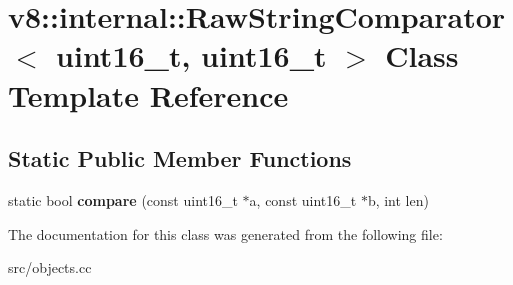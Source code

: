 \hypertarget{classv8_1_1internal_1_1_raw_string_comparator_3_01uint16__t_00_01uint16__t_01_4}{}\section{v8\+:\+:internal\+:\+:Raw\+String\+Comparator$<$ uint16\+\_\+t, uint16\+\_\+t $>$ Class Template Reference}
\label{classv8_1_1internal_1_1_raw_string_comparator_3_01uint16__t_00_01uint16__t_01_4}
\subsection*{Static Public Member Functions}
\begin{DoxyCompactItemize}
\item 
\hypertarget{classv8_1_1internal_1_1_raw_string_comparator_3_01uint16__t_00_01uint16__t_01_4_ab0afdcfb4e2f09e9c15e2aa8e5d4e8b5}{}static bool {\bfseries compare} (const uint16\+\_\+t $\ast$a, const uint16\+\_\+t $\ast$b, int len)\label{classv8_1_1internal_1_1_raw_string_comparator_3_01uint16__t_00_01uint16__t_01_4_ab0afdcfb4e2f09e9c15e2aa8e5d4e8b5}

\end{DoxyCompactItemize}


The documentation for this class was generated from the following file\+:\begin{DoxyCompactItemize}
\item 
src/objects.\+cc\end{DoxyCompactItemize}
